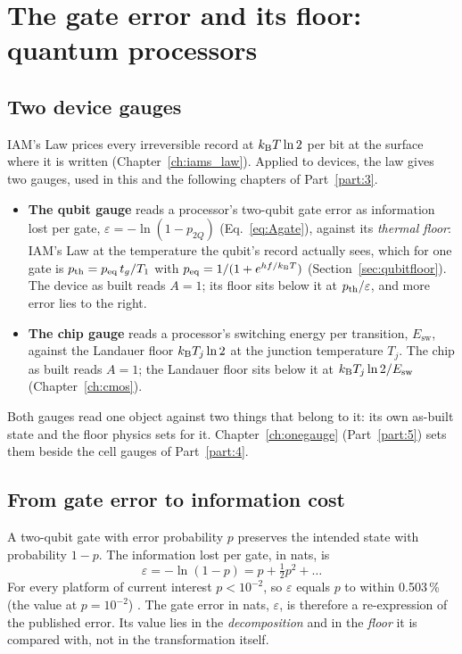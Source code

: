 \chapter{The gate error and its floor: quantum processors}\label{ch:ascoreqc}

\section{Two device gauges}\label{sec:devicegauges}

IAM's Law prices every irreversible record at $k_{\mathrm B} T\ln2$ per bit at the surface where it is written (Chapter~\ref{ch:iams_law}). Applied to devices,
the law gives two gauges, used in this and the following chapters of Part~\ref{part:3}.
\begin{itemize}
\item \textbf{The qubit gauge} reads a processor's two-qubit gate error as information lost per gate, $\varepsilon=-\ln(1-p_{2Q})$
(Eq.~\eqref{eq:Agate}), against its \emph{thermal floor}: IAM's Law at the temperature the qubit's record actually sees, which for one gate
is $p_{\rm th}=p_{\rm eq}\,t_g/T_1$ with $p_{\rm eq}=1/(1+e^{hf/k_{\mathrm B} T})$ (Section~\ref{sec:qubitfloor}). The device as built reads $A=1$; its
floor sits below it at $p_{\rm th}/\varepsilon$, and more error lies to the right.
\item \textbf{The chip gauge} reads a processor's switching energy per transition, $E_{\mathrm{sw}}$, against the Landauer floor
$k_{\mathrm B} T_j\ln2$ at the junction temperature $T_j$. The chip as built reads $A=1$; the Landauer floor sits below it at $k_{\mathrm B} T_j\ln2/E_{\mathrm{sw}}$
(Chapter~\ref{ch:cmos}).
\end{itemize}
Both gauges read one object against two things that belong to it: its own as-built state and the floor physics sets for it. Chapter~\ref{ch:onegauge}
(Part~\ref{part:5}) sets them beside the cell gauges of Part~\ref{part:4}.

\section{From gate error to information cost}

A two-qubit gate with error probability $p$ preserves the intended state with probability
$1-p$. The information lost per gate, in nats, is
\begin{equation}
 \varepsilon=-\ln(1-p)=p+\tfrac12p^2+\dots
 \label{eq:Agate}
\end{equation}
For every platform of current interest $p<10^{-2}$, so $\varepsilon$ equals $p$ to within
0.503\,\% (the value at $p=10^{-2}$) \calc. The gate error in nats, $\varepsilon$, is therefore a re-expression of the published error. Its value lies in the
\emph{decomposition} and in the \emph{floor} it is compared with, not in the transformation itself.

